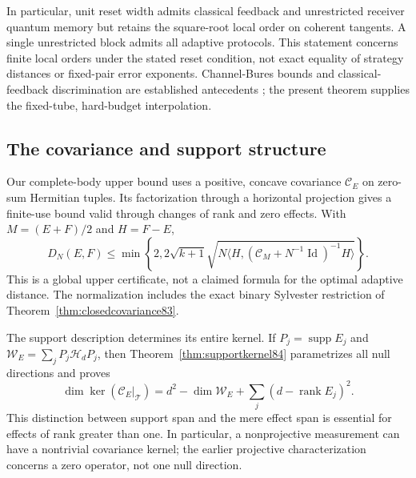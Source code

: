 In particular, unit reset width admits classical feedback and
unrestricted receiver quantum memory but retains the square-root
local order on coherent tangents.  A single unrestricted block
admits all adaptive protocols.  This statement concerns finite local
orders under the stated reset condition, not exact equality of
strategy distances or fixed-pair error exponents.  Channel-Bures
bounds and classical-feedback discrimination are established
antecedents \cite{HMNW88,SHW87}; the present theorem supplies the
fixed-tube, hard-budget interpolation.

\subsection{The covariance and support structure}
Our complete-body upper bound uses a positive, concave covariance
$\mathcal C_E$ on zero-sum Hermitian tuples.  Its factorization through
a horizontal projection gives a finite-use bound valid through changes
of rank and zero effects.  With $M=(E+F)/2$ and $H=F-E$,
\begin{equation}\label{eq:frontupper84}
 D_N(E,F)\le\min\left\{2,2\sqrt{k+1}
  \sqrt{N\langle H,(\mathcal C_M+N^{-1}\operatorname{Id})^{-1}H\rangle}
                              \right\}.
\end{equation}
This is a global upper certificate, not a claimed formula for the
optimal adaptive distance.  The normalization includes the exact
binary Sylvester restriction of Theorem~\ref{thm:closedcovariance83}.

The support description determines its entire kernel.  If
$P_j=\operatorname{supp}E_j$ and
$\mathcal W_E=\sum_jP_j\mathcal H_dP_j$, then
Theorem~\ref{thm:supportkernel84} parametrizes all null directions
and proves
\[
 \dim\ker(\mathcal C_E|_{\mathcal T})
 =d^2-\dim\mathcal W_E+\sum_j(d-\operatorname{rank}E_j)^2.
\]
This distinction between support span and the mere effect span is
essential for effects of rank greater than one.  In particular,
a nonprojective measurement can have a nontrivial covariance kernel;
the earlier projective characterization concerns a zero operator,
not one null direction.

